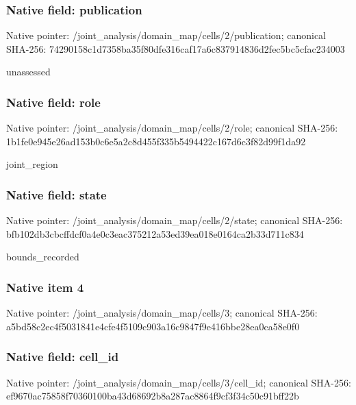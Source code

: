 \documentclass[10pt,a4paper]{article}
\begin{document}
\subsubsection{Native field: publication}
Native pointer: /joint\_\allowbreak{}analysis/domain\_\allowbreak{}map/cells/2/publication; canonical SHA-256: 74290158c1d7358ba35f80dfe316caf17a6c837914836d2fec5bc5cfac234003

\begingroup\raggedright\sloppy unassessed\par\endgroup

\subsubsection{Native field: role}
Native pointer: /joint\_\allowbreak{}analysis/domain\_\allowbreak{}map/cells/2/role; canonical SHA-256: 1b1fe0e945e26ad153b0c6e5a2c8d455f335b5494422c167d6c3f82d99f1da92

\begingroup\raggedright\sloppy joint\_\allowbreak{}region\par\endgroup

\subsubsection{Native field: state}
Native pointer: /joint\_\allowbreak{}analysis/domain\_\allowbreak{}map/cells/2/state; canonical SHA-256: bfb102db3cbcffdcf0a4e0c3eac375212a53ed39ea018e0164ca2b33d711c834

\begingroup\raggedright\sloppy bounds\_\allowbreak{}recorded\par\endgroup

\subsubsection{Native item 4}
Native pointer: /joint\_\allowbreak{}analysis/domain\_\allowbreak{}map/cells/3; canonical SHA-256: a5bd58c2ec4f5031841e4cfe4f5109c903a16c9847f9e416bbe28ea0ca58e0f0

\subsubsection{Native field: cell\_\allowbreak{}id}
Native pointer: /joint\_\allowbreak{}analysis/domain\_\allowbreak{}map/cells/3/cell\_\allowbreak{}id; canonical SHA-256: ef9670ac75858f70360100ba43d68692b8a287ac8864f9cf3f34c50c91bff22b
\end{document}
